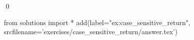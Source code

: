 
\begin{ex} 
  \label{ex:case_sensitive_return}
  
  \qed
\end{ex} 
\begin{python0}
from solutions import *
add(label="ex:case_sensitive_return",
    srcfilename='exercises/case_sensitive_return/answer.tex') 
\end{python0}
